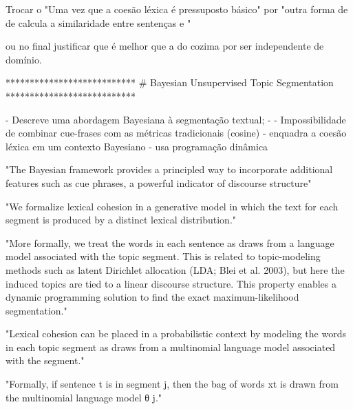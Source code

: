 



Trocar o "Uma vez que a coesão léxica é pressuposto básico" por "outra forma de de calcula a similaridade entre sentenças e "

ou no final justificar que é melhor que a do cozima por ser independente de domínio.














***************************
# Bayesian Unsupervised Topic Segmentation
***************************

- Descreve uma abordagem Bayesiana à segmentação textual;
- 
- Impossibilidade de combinar cue-frases com as métricas tradicionais (cosine)
- {enquadra a coesão léxica em um contexto Bayesiano}
- usa programação dinâmica

"The Bayesian framework provides a principled way to incorporate additional features such as cue phrases, a powerful indicator of discourse structure"


"We formalize lexical cohesion in a generative model in which the text for each segment is produced by a distinct lexical distribution." 


"More formally, we treat the words in each sentence as draws from a language model associated with the topic segment. This is related to topic-modeling methods such as latent Dirichlet allocation (LDA; Blei et al. 2003), but here the induced topics are tied to a linear discourse structure. This property enables a dynamic programming solution to find the exact maximum-likelihood segmentation." 



"Lexical cohesion can be placed in a probabilistic context by modeling the words in each topic segment as draws from a multinomial language model associated with the segment."

"Formally, if sentence t is in segment j, then the bag of words xt is drawn from the multinomial language model θ j."

